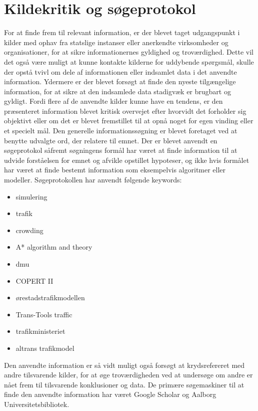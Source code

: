 \section{Kildekritik og søgeprotokol}
For at finde frem til relevant information, er der blevet taget udgangspunkt i kilder med ophav fra statslige instanser eller anerkendte virksomheder og organisationer, for at sikre informationernes gyldighed og troværdighed. Dette vil det også være muligt at kunne kontakte kilderne for uddybende spørgsmål, skulle der opstå tvivl om dele af informationen eller indsamlet data i det anvendte information. Ydermere er der blevet forsøgt at finde den nyeste tilgængelige information, for at sikre at den indsamlede data stadigvæk er brugbart og gyldigt. Fordi flere af de anvendte kilder kunne have en tendens, er den præsenteret information blevet kritisk overvejet efter hvorvidt det forholder sig objektivt eller om det er blevet fremstillet til at opnå noget for egen vinding eller et specielt mål. Den generelle informationssøgning er blevet foretaget ved at benytte udvalgte ord, der relatere til emnet.
Der er blevet anvendt en søgeprotokol såfremt søgningens formål har været at finde information til at udvide forståelsen for emnet og afvikle opstillet hypoteser, og ikke hvis formålet har været at finde bestemt information som eksempelvis algoritmer eller modeller. Søgeprotokollen har anvendt følgende keywords:

\begin{itemize}
\item simulering
\item trafik
\item crowding
\item A* algorithm and theory
\item dmu
\item COPERT II
\item ørestadstrafikmodellen
\item Trans-Tools traffic
\item trafikministeriet
\item altrans trafikmodel
\end{itemize}
 Den anvendte information er så vidt muligt også forsøgt at krydsrefereret med andre tilsvarende kilder, for at øge troværdigheden ved at undersøge om andre er nået frem til tilsvarende konklusioner og data. De primære søgemaskiner til at finde den anvendte information har været Google Scholar og Aalborg Universitetsbibliotek. 
